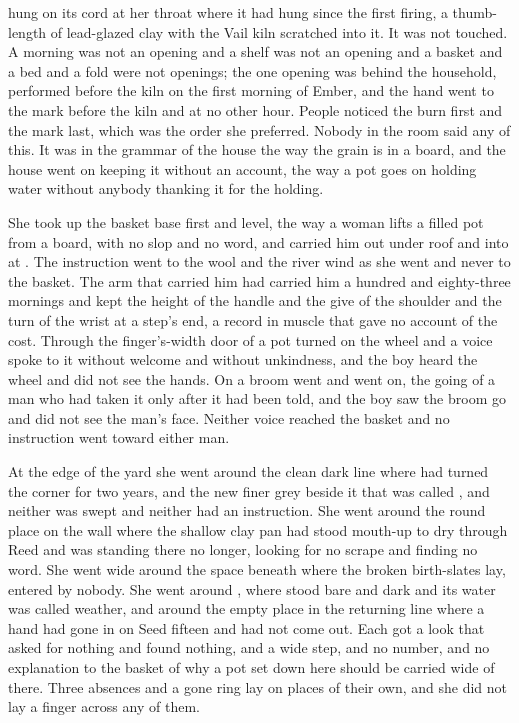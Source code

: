  hung on its cord at her throat where it had hung since the first firing, a thumb-length of lead-glazed clay with the Vail kiln scratched into it. It was not touched. A morning was not an opening and a shelf was not an opening and a basket and a bed and a fold were not openings; the one opening was behind the household, performed before the kiln on the first morning of Ember, and the hand went to the mark before the kiln and at no other hour. People noticed the burn first and the mark last, which was the order she preferred. Nobody in the room said any of this. It was in the grammar of the house the way the grain is in a board, and the house went on keeping it without an account, the way a pot goes on holding water without anybody thanking it for the holding.

She took up the basket base first and level, the way a woman lifts a filled pot from a board, with no slop and no word, and carried him out under  roof and into  at . The instruction went to the wool and the river wind as she went and never to the basket. The arm that carried him had carried him a hundred and eighty-three mornings and kept the height of the handle and the give of the shoulder and the turn of the wrist at a step's end, a record in muscle that gave no account of the cost. Through the finger's-width door of  a pot turned on the wheel and a voice spoke to it without welcome and without unkindness, and the boy heard the wheel and did not see the hands. On  a broom went and went on, the going of a man who had taken it only after it had been told, and the boy saw the broom go and did not see the man's face. Neither voice reached the basket and no instruction went toward either man.

At the edge of the yard she went around the clean dark line where  had turned the corner for two years, and the new finer grey beside it that was called , and neither was swept and neither had an instruction. She went around the round place on the wall where the shallow clay pan had stood mouth-up to dry through Reed and was standing there no longer, looking for no scrape and finding no word. She went wide around the space beneath  where the broken birth-slates lay, entered by nobody. She went around , where  stood bare and dark and its water was called weather, and around the empty place in the returning line where a hand had gone in on Seed fifteen and had not come out. Each got a look that asked for nothing and found nothing, and a wide step, and no number, and no explanation to the basket of why a pot set down here should be carried wide of there. Three absences and a gone ring lay on places of their own, and she did not lay a finger across any of them.

